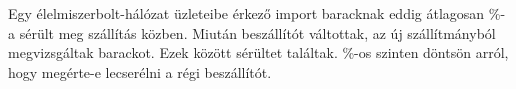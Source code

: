 Egy élelmiszerbolt-hálózat üzleteibe érkező import baracknak eddig 
átlagosan \%-a sérült meg szállítás közben. Miután beszállítót 
váltottak, az új szállítmányból megvizsgáltak  barackot. 
Ezek között  sérültet találtak. \%-os szinten döntsön arról, 
hogy megérte-e lecserélni a régi beszállítót.